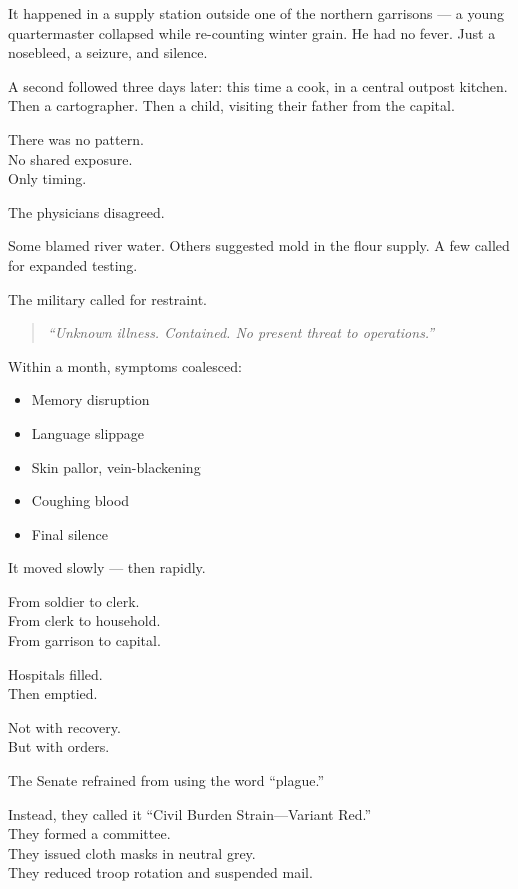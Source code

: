 \documentclass[9pt]{article}
\begin{document}
It happened in a supply station outside one of the northern garrisons — a young quartermaster collapsed while re-counting winter grain. He had no fever. Just a nosebleed, a seizure, and silence.

A second followed three days later: this time a cook, in a central outpost kitchen. Then a cartographer. Then a child, visiting their father from the capital.

There was no pattern.\\
No shared exposure.\\
Only timing.

\vspace{1em}

The physicians disagreed.

Some blamed river water. Others suggested mold in the flour supply. A few called for expanded testing.

The military called for restraint.

\begin{quote}
\textit{“Unknown illness. Contained. No present threat to operations.”}
\end{quote}

\vspace{1em}

Within a month, symptoms coalesced:

\begin{itemize}
  \item Memory disruption
  \item Language slippage
  \item Skin pallor, vein-blackening
  \item Coughing blood
  \item Final silence
\end{itemize}

It moved slowly — then rapidly.

From soldier to clerk.\\
From clerk to household.\\
From garrison to capital.

Hospitals filled.\\
Then emptied.

Not with recovery.\\
But with orders.

\vspace{1em}

The Senate refrained from using the word “plague.”

Instead, they called it “Civil Burden Strain—Variant Red.”\\
They formed a committee.\\
They issued cloth masks in neutral grey.\\
They reduced troop rotation and suspended mail.
\end{document}
